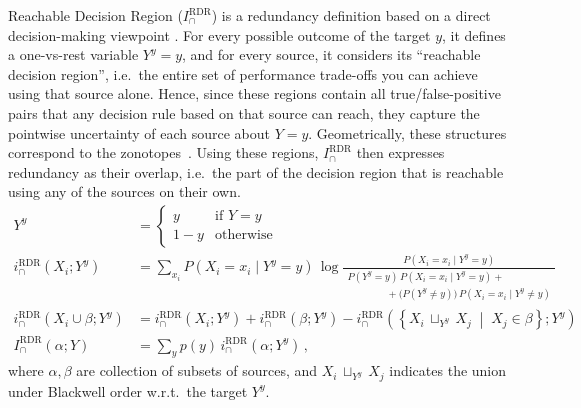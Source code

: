\documentclass{article}
\newcommand{\IRDR}{\ensuremath{I_\cap^{\text{RDR}}}\xspace}
\begin{document}
Reachable Decision Region ($\IRDR$) is a redundancy definition based on a direct decision-making viewpoint \cite{mages2023decomposing}. For every possible outcome of the target $y$, it defines a one-vs-rest variable $Y^y=y$, and for every source, it considers its “reachable decision region”, i.e.\ the entire set of performance trade-offs you can achieve using that source alone. 
Hence, since these regions contain all true/false-positive pairs that any decision rule based on that source can reach, they capture the pointwise uncertainty of each source about $Y=y$. Geometrically, these structures correspond to the zonotopes~\cite{eppstein1995zonohedra}. 
Using these regions, \IRDR then expresses redundancy as their overlap, i.e.\ the part of the decision region that is reachable using any of the sources on their own. 
\begin{align}
Y^y & = \begin{cases} y & \text{if } Y = y \\ 1-y & \text{otherwise} \end{cases} \\ \label{eq:RDR_eq1}
i_\cap^\text{RDR}\!\left(X_i; Y^y \right) &= \sum_{x_i} P\!\left(X_i=x_i \mid Y^y = y\right)\, \log \frac{ P\!\left(X_i=x_i \mid Y^y = y\right) }
     { \displaystyle
       \begin{array}{l}
         P(Y^y=y)\,P\!\left(X_i=x_i \mid Y^y = y\right)+ \\[0mm]
         \qquad\qquad+ \bigl(P(Y^y\ne y)\bigr)\, P\!\left(X_i=x_i \mid Y^y \neq y\right)
       \end{array} } \\[4pt]
i_\cap^\text{RDR}\!\left(X_i \cup \beta ; Y^y \right) &= i_\cap^\text{RDR}\!\left(X_i; Y^y\right) + i_\cap^\text{RDR}\!\left(\beta; Y^y\right) - i_\cap^\text{RDR}\!\left( \left\{ X_i \,\sqcup_{Y^y}\, X_j \;\middle|\; X_j \in \beta \right\}; Y^y \right) \\[1em] 
\IRDR(\alpha;Y) &= \sum_y p(y) \,i_\cap^\text{RDR}\left(\alpha; Y^y\right) \,,
\end{align}
where $\alpha,\beta$ are collection of subsets of sources, and $X_i \,\sqcup_{Y^y}\, X_j$ indicates the union under Blackwell order w.r.t.\ the target $Y^y$.
\end{document}
